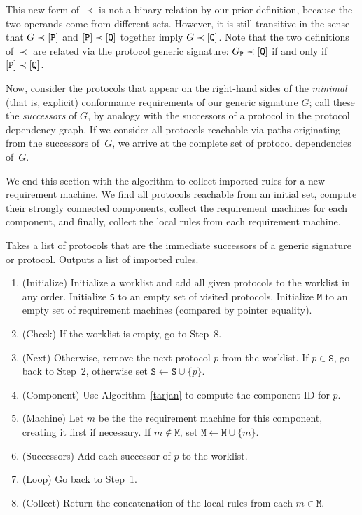 \documentclass[../generics]{subfiles}
\begin{document}
This new form of $\prec$ is not a binary relation by our prior definition, because the two operands come from different sets. However, it is still transitive in the sense that $G\prec[\texttt{P}]$ and $[\texttt{P}]\prec[\texttt{Q}]$ together imply $G\prec[\texttt{Q}]$. Note that the two definitions of $\prec$ are related via the protocol generic signature: $G_\texttt{P}\prec[\texttt{Q}]$ if and only if $[\texttt{P}]\prec[\texttt{Q}]$.

Now, consider the protocols that appear on the right-hand sides of the \emph{minimal} (that is, explicit) conformance requirements of our generic signature $G$; call these the \emph{successors} of $G$, by analogy with the successors of a protocol in the protocol dependency graph. If we consider all protocols reachable via paths originating from the successors of~$G$, we arrive at the complete set of protocol dependencies of~$G$.

We end this section with the algorithm to collect imported rules for a new requirement machine. We find all protocols reachable from an initial set, compute their strongly connected components, collect the requirement machines for each component, and finally, collect the local rules from each requirement machine.
\begin{algorithm}\label{importing rules}
Takes a list of protocols that are the immediate successors of a generic signature or protocol. Outputs a list of imported rules.
\begin{enumerate}
\item (Initialize) Initialize a worklist and add all given protocols to the worklist in any order. Initialize \texttt{S} to an empty set of visited protocols. Initialize \texttt{M} to an empty set of requirement machines (compared by pointer equality).
\item (Check) If the worklist is empty, go to Step~8.
\item (Next) Otherwise, remove the next protocol $p$ from the worklist. If $p\in\texttt{S}$, go back to Step~2, otherwise set $\texttt{S}\leftarrow\texttt{S}\cup\{p\}$.
\item (Component) Use Algorithm~\ref{tarjan} to compute the component ID for $p$.
\item (Machine) Let $m$ be the the requirement machine for this component, creating it first if necessary. If $m\not\in\texttt{M}$, set $\texttt{M}\leftarrow\texttt{M}\cup\{m\}$.
\item (Successors) Add each successor of $p$ to the worklist.
\item (Loop) Go back to Step~1.
\item (Collect) Return the concatenation of the local rules from each $m\in\texttt{M}$.
\end{enumerate}
\end{algorithm}
\end{document}
